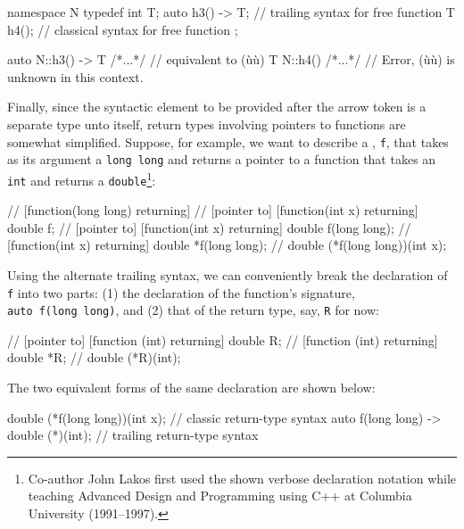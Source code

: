 \begin{emcppslisting}
namespace N
{
    typedef int T;
    auto h3() -> T;  // trailing syntax for free function
    T h4();          // classical syntax for free function
};

auto N::h3() -> T { /*...*/ }  // equivalent to (ù{}ù)
T    N::h4()      { /*...*/ }  // Error, (ù{}ù) is unknown in this context.
\end{emcppslisting}


Finally, since the syntactic element to be provided after the arrow
token is a separate type unto itself, return types involving pointers to
functions are somewhat simplified. Suppose, for example, we want to
describe a , \lstinline!f!, that takes as its
argument a \lstinline!long!~\lstinline!long! and returns a pointer to a
function that takes an \lstinline!int! and returns a
\lstinline!double!{\cprotect\footnote{Co-author John Lakos first used the shown verbose declaration notation
while teaching Advanced Design and Programming using C++ at Columbia
  University (1991--1997).}}:

\begin{emcppslisting}
// [function(long long) returning]
//     [pointer to] [function(int x) returning] double   f;
//     [pointer to] [function(int x) returning] double   f(long long);
//                  [function(int x) returning] double  *f(long long);
//                                              double (*f(long long))(int x);
\end{emcppslisting}

\noindent Using the alternate trailing syntax, we can conveniently break the
declaration of \lstinline!f! into two parts: (1) the declaration of the
function's signature, \lstinline!auto!~\lstinline!f(long!~\lstinline!long)!, and (2) that of the return type, say, \lstinline!R! for now:

\begin{emcppslisting}
// [pointer to] [function (int) returning] double   R;
//              [function (int) returning] double  *R;
//                                         double (*R)(int);
\end{emcppslisting}
\pagebreak%

\noindent The two equivalent forms of the same declaration are shown below:

\begin{emcppslisting}
double (*f(long long))(int x);         // classic return-type syntax
auto f(long long) -> double (*)(int);  // trailing return-type syntax
\end{emcppslisting}

